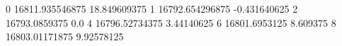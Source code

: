 0 16811.935546875 18.849609375
1 16792.654296875 -0.431640625
2 16793.0859375 0.0
4 16796.52734375 3.44140625
6 16801.6953125 8.609375
8 16803.01171875 9.92578125
